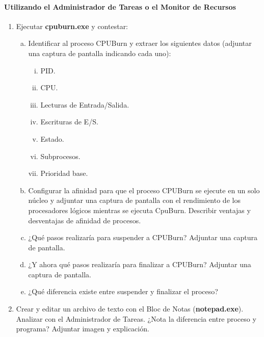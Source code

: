 \documentclass[12pt]{article}
\begin{document}
  \paragraph{Utilizando el Administrador de Tareas o el Monitor de Recursos}\mbox{}

  \begin{enumerate}[1.]
    \item Ejecutar \textbf{cpuburn.exe} y contestar:
	    \begin{enumerate}[a.]
	      \item Identificar al proceso CPUBurn y extraer los siguientes datos (adjuntar una captura de pantalla indicando cada uno):
		      \begin{enumerate}[i.]
		        \item PID.

		        \item CPU.

		        \item Lecturas de Entrada/Salida.

		        \item Escrituras de E/S.

		        \item Estado.

		        \item Subprocesos.

		        \item Prioridad base.
		      \end{enumerate}

		\item Configurar la afinidad para que el proceso CPUBurn se ejecute en un solo núcleo y adjuntar una captura de pantalla con el rendimiento de los procesadores lógicos mientras se ejecuta CpuBurn. Describir ventajas y desventajas de afinidad de procesos.

		\item ¿Qué pasos realizaría para suspender a CPUBurn? Adjuntar una captura de pantalla.

		\item ¿Y ahora qué pasos realizaría para finalizar a CPUBurn? Adjuntar una captura de pantalla.

		\item ¿Qué diferencia existe entre suspender y finalizar el proceso?
	    \end{enumerate}
	
	\item Crear y editar un archivo de texto con el Bloc de Notas (\textbf{notepad.exe}). Analizar con el Administrador de Tareas. ¿Nota la diferencia entre proceso y programa? Adjuntar imagen y explicación.


\end{enumerate}
\end{document}

